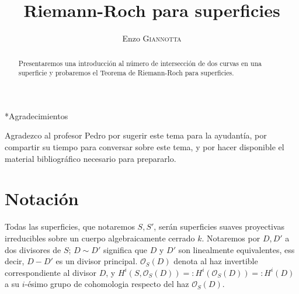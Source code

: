 \documentclass[spanish,12pt]{amsart}
\makeatletter
\renewcommand\subsection{\@startsection{subsection}{2}%
  \z@{.5\linespacing\@plus.7\linespacing}{-.5em}%
  {\normalfont\sffamily}}
\theoremstyle{definition}
\theoremstyle{remark}
\numberwithin{equation}{section}
\renewcommand{\O}{\mathcal{O}}
\makeatother
\begin{document}
\title{Riemann-Roch para superficies}

\author{Enzo \textsc{Giannotta}}





\begin{abstract}
Presentaremos una introducción al número de intersección de dos curvas en una superficie y probaremos el Teorema de Riemann-Roch para superficies.
\end{abstract}

\maketitle

\tableofcontents








\subsection*{Agradecimientos}

Agradezco al profesor Pedro por sugerir este tema para la ayudantía, por compartir su tiempo para conversar sobre este tema, y por hacer disponible el material bibliográfico necesario para prepararlo.


\section{Notación}

Todas las superficies, que notaremos $S,S'$, serán superficies suaves proyectivas irreducibles sobre un cuerpo algebraicamente cerrado $k$. Notaremos por $D,D'$ a dos divisores de $S$; $D\sim D'$ significa que $D$ y $D'$ son linealmente equivalentes, ess decir, $D-D'$ es un divisor principal. $\O_S (D)$ denota al haz invertible correspondiente al divisor $D$, y $H^i (S, \O_S (D)) =: H^i (\O_S (D)) =: H^i (D)$ a su $i$-ésimo grupo de cohomologia respecto del haz $\O_S (D)$.
\end{document}
